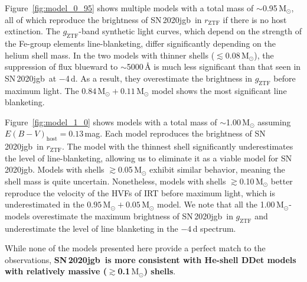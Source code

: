 \documentclass[twocolumn]{aastex631}
\newcommand{\sn}{SN\,2020jgb}
\newcommand{\Ni}{$^{56}\mathrm{Ni}$}
\newcommand{\Msun}{\mathrm{M_\odot}}
\newcommand{\chang}[1]{\textcolor{blue}{[Chang: #1]}}
\newcommand{\toAbi}[1]{\textcolor{orange}{[Abi: #1]}}
\newcommand{\revise}[1]{\textbf{#1}}
\begin{document}
Figure~\ref{fig:model_0_95} shows multiple models with a total mass of $\sim$0.95\,$\Msun$, all of which reproduce the brightness of \sn\ in $r_\mathrm{ZTF}$ if there is no host extinction. The $g_\mathrm{ZTF}$-band synthetic light curves, which depend on the strength of the Fe-group elements line-blanketing, differ significantly depending on the helium shell mass. In the two models with thinner shells ($\lesssim$0.08\,$\Msun$), the suppression of flux blueward to $\sim$5000\,\r{A} is much less significant than that seen in \sn\ at $-$4\,d. As a result, they overestimate the brightness in $g_\mathrm{ZTF}$ before maximum light. The $0.84\,\Msun+0.11\,\Msun$ model shows the most significant line blanketing. %

Figure~\ref{fig:model_1_0} shows models with a total mass of $\sim$1.00\,$\Msun$ assuming $E(B-V)_\mathrm{host}=0.13$\,mag. Each model reproduces the brightness of \sn\ in $r_\mathrm{ZTF}$. The model with the thinnest shell significantly underestimates the level of line-blanketing, allowing us to eliminate it as a viable model for \sn. Models with shells $\gtrsim$0.05\,$\Msun$ exhibit similar behavior, meaning the shell mass is quite uncertain. Nonetheless, models with shells $\gtrsim$0.10\,$\Msun$ better reproduce the velocity of the HVFs of  IRT before maximum light, which is underestimated in the $0.95\,\Msun+0.05\,\Msun$ model. We note that all the 1.00\,$\Msun$-models overestimate the maximum brightness of \sn\ in $g_\mathrm{ZTF}$ and underestimate the level of line blanketing in the $-4$\,d spectrum. %

While none of the models presented here provide a perfect match to the observations, \revise{\sn\ is more consistent with He-shell DDet models with relatively massive ($\gtrsim$0.1\,$\Msun$) shells}.






\end{document}
